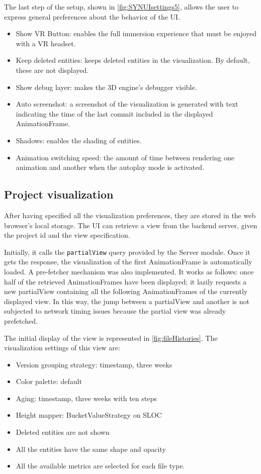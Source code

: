 The last step of the setup, shown in \autoref{fig:SYNUIsettings5}, allows the user to express general preferences about the behavior of the UI.

\begin{itemize}
    \item Show VR Button: enables the full immersion experience that must be enjoyed with a VR headset. 
    \item Keep deleted entities: keeps deleted entities in the visualization. By default, these are not displayed. 
    \item Show debug layer: makes the 3D engine's debugger visible. 
    \item Auto screenshot: a screenshot of the visualization is generated with text indicating the time of the last commit included in the displayed AnimationFrame.
    \item Shadows: enables the shading of entities. 
    \item Animation switching speed: the amount of time between rendering one animation and another when the autoplay mode is activated. 
\end{itemize}



\subsection{Project visualization}
After having specified all the visualization preferences, they are stored in the web browser's local storage. 
The UI can retrieve a view from the backend server, given the project id and the view specification. 

Initially, it calls the \texttt{partialView} query provided by the Server module. Once it gets the response, the visualization of the first AnimationFrame is automatically loaded. 
A pre-fetcher mechanism was also implemented. It works as follows: once half of the retrieved AnimationFrames have been displayed; it lazily requests a new partialView containing all the following AnimationFrames of the currently displayed view. 
In this way, the jump between a partialView and another is not subjected to network timing issues because the partial view was already prefetched. 


The initial display of the view is represented in \autoref{fig:fileHistories}. The visualization settings of this view are:
\begin{itemize}
    \item Version grouping strategy: timestamp, three weeks
    \item Color palette: default
    \item Aging: timestamp, three weeks with ten steps
    \item Height mapper: BucketValueStrategy on SLOC
    \item Deleted entities are not shown
    \item All the entities have the same shape and opacity
    \item All the available metrics are selected for each file type. 
\end{itemize}

